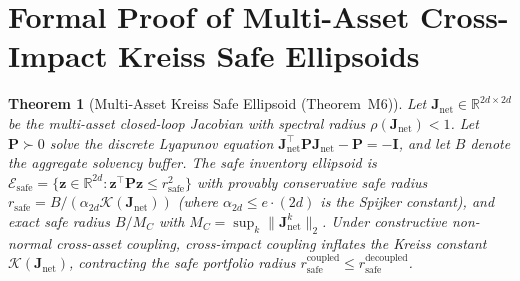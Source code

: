 \documentclass[11pt,a4paper]{article}
\newtheorem{theorem}{Theorem}[section]
\theoremstyle{definition}\newtheorem{definition}[theorem]{Definition}
\theoremstyle{remark}\newtheorem{remark}[theorem]{Remark}
\begin{document}
\section{Formal Proof of Multi-Asset Cross-Impact Kreiss Safe Ellipsoids}
\label{sec:supp_multi_asset_kreiss}
\begin{theorem}[Multi-Asset Kreiss Safe Ellipsoid (Theorem~M6)]\label{thm:supp_m6}
Let $\mathbf{J}_{\text{net}} \in \mathbb{R}^{2d \times 2d}$ be the multi-asset closed-loop Jacobian with spectral radius $\rho(\mathbf{J}_{\text{net}}) < 1$. Let $\mathbf{P} \succ 0$ solve the discrete Lyapunov equation $\mathbf{J}_{\text{net}}^\top \mathbf{P} \mathbf{J}_{\text{net}} - \mathbf{P} = -\mathbf{I}$, and let $B$ denote the aggregate solvency buffer.
The safe inventory ellipsoid is $\mathcal{E}_{\text{safe}} = \{ \mathbf{z} \in \mathbb{R}^{2d} : \mathbf{z}^\top \mathbf{P} \mathbf{z} \le r_{\text{safe}}^2 \}$ with provably conservative safe radius $r_{\text{safe}} = B / (\alpha_{2d} \mathcal{K}(\mathbf{J}_{\text{net}}))$ (where $\alpha_{2d} \le e \cdot (2d)$ is the Spijker constant), and exact safe radius $B/M_C$ with $M_C = \sup_k \|\mathbf{J}_{\text{net}}^k\|_2$. Under constructive non-normal cross-asset coupling, cross-impact coupling inflates the Kreiss constant $\mathcal{K}(\mathbf{J}_{\text{net}})$, contracting the safe portfolio radius $r_{\text{safe}}^{\text{coupled}} \le r_{\text{safe}}^{\text{decoupled}}$.
\end{theorem}
\end{document}
